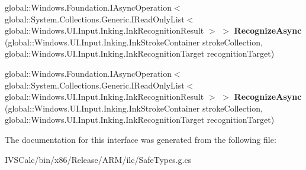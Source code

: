 \begin{DoxyCompactItemize}
\item 
\mbox{\label{interface_windows_1_1_u_i_1_1_input_1_1_inking_1_1_i_ink_recognizer_container_a08545c60273511304312be2fb376e96e}} 
global\+::\+Windows.\+Foundation.\+I\+Async\+Operation$<$ global\+::\+System.\+Collections.\+Generic.\+I\+Read\+Only\+List$<$ global\+::\+Windows.\+U\+I.\+Input.\+Inking.\+Ink\+Recognition\+Result $>$ $>$ {\bfseries Recognize\+Async} (global\+::\+Windows.\+U\+I.\+Input.\+Inking.\+Ink\+Stroke\+Container stroke\+Collection, global\+::\+Windows.\+U\+I.\+Input.\+Inking.\+Ink\+Recognition\+Target recognition\+Target)
\item 
\mbox{\label{interface_windows_1_1_u_i_1_1_input_1_1_inking_1_1_i_ink_recognizer_container_a08545c60273511304312be2fb376e96e}} 
global\+::\+Windows.\+Foundation.\+I\+Async\+Operation$<$ global\+::\+System.\+Collections.\+Generic.\+I\+Read\+Only\+List$<$ global\+::\+Windows.\+U\+I.\+Input.\+Inking.\+Ink\+Recognition\+Result $>$ $>$ {\bfseries Recognize\+Async} (global\+::\+Windows.\+U\+I.\+Input.\+Inking.\+Ink\+Stroke\+Container stroke\+Collection, global\+::\+Windows.\+U\+I.\+Input.\+Inking.\+Ink\+Recognition\+Target recognition\+Target)
\end{DoxyCompactItemize}


The documentation for this interface was generated from the following file\+:\begin{DoxyCompactItemize}
\item 
I\+V\+S\+Calc/bin/x86/\+Release/\+A\+R\+M/ilc/Safe\+Types.\+g.\+cs\end{DoxyCompactItemize}
